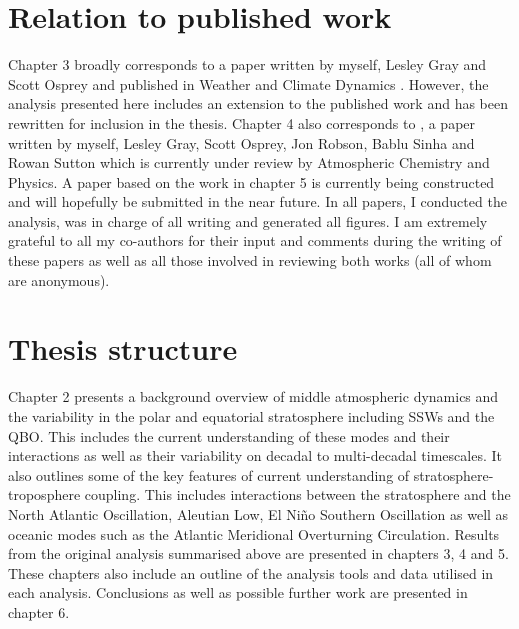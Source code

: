 \section{Relation to published work}

Chapter 3 broadly corresponds to a paper written by myself, Lesley Gray and Scott Osprey and published in Weather and Climate Dynamics \citep{dimdore-milesOrigins2020b}. However, the analysis presented here includes an extension to the published work and has been rewritten for inclusion in the thesis. Chapter 4 also corresponds to \cite{dimdore-milesInteractions2021}, a paper written by myself, Lesley Gray, Scott Osprey, Jon Robson, Bablu Sinha and Rowan Sutton which is currently under review by Atmospheric Chemistry and Physics. A paper based on the work in chapter 5 is currently being constructed and will hopefully be submitted in the near future. 
In all papers, I conducted the analysis, was in charge of all writing and generated all figures. I am extremely grateful to all my co-authors for their input and comments during the writing of these papers as well as all those involved in reviewing both works (all of whom are anonymous).  

\section{Thesis structure}
Chapter 2 presents a background overview of middle atmospheric dynamics and the variability in the polar and equatorial stratosphere including SSWs and the QBO. This includes the current understanding of these modes and their interactions as well as their variability on decadal to multi-decadal timescales. It also outlines some of the key features of current understanding of stratosphere-troposphere coupling. This includes interactions between the stratosphere and the North Atlantic Oscillation, Aleutian Low, El Ni\~{n}o Southern Oscillation as well as oceanic modes such as the Atlantic Meridional Overturning Circulation. Results from the original analysis summarised above are presented in chapters 3, 4 and 5. These chapters also include an outline of the analysis tools and data utilised in each analysis. Conclusions as well as possible further work are presented in chapter 6.








